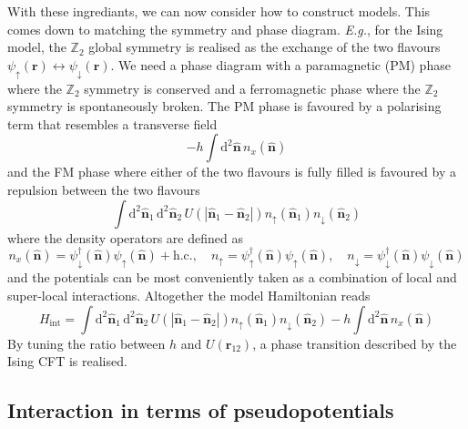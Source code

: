 \documentclass{timesjhep}
\begin{document}
With these ingrediants, we can now consider how to construct models. This comes down to matching the symmetry and phase diagram. \textit{E.g.}, for the Ising model, the $\mathbb{Z}_2$ global symmetry is realised as the exchange of the two flavours $\psi_\uparrow(\mathbf{r})\leftrightarrow\psi_\downarrow(\mathbf{r})$. We need a phase diagram with a paramagnetic (PM) phase where the $\mathbb{Z}_2$ symmetry is conserved and a ferromagnetic phase where the $\mathbb{Z}_2$ symmetry is spontaneously broken. The PM phase is favoured by a polarising term that resembles a transverse field
\begin{equation*}
    -h\int\mathrm{d}^2\hat{\mathbf{n}}\,n_x(\hat{\mathbf{n}})
\end{equation*}
and the FM phase where either of the two flavours is fully filled is favoured by a repulsion between the two flavours 
\begin{equation*}
    \int\mathrm{d}^2\hat{\mathbf{n}}_1\,\mathrm{d}^2\hat{\mathbf{n}}_2\,U(|\hat{\mathbf{n}}_1-\hat{\mathbf{n}}_2|)n_\uparrow(\hat{\mathbf{n}}_1)n_\downarrow(\hat{\mathbf{n}}_2) 
\end{equation*} 
where the density operators are defined as 
\begin{equation*}
    n_x(\hat{\mathbf{n}})=\psi^\dagger_\downarrow(\hat{\mathbf{n}})\psi_\uparrow(\hat{\mathbf{n}})+\mathrm{h.c.},\quad n_\uparrow=\psi^\dagger_\uparrow(\hat{\mathbf{n}})\psi_\uparrow(\hat{\mathbf{n}}),\quad n_\downarrow=\psi^\dagger_\downarrow(\hat{\mathbf{n}})\psi_\downarrow(\hat{\mathbf{n}}) 
\end{equation*}
and the potentials can be most conveniently taken as a combination of local and super-local interactions. Altogether the model Hamiltonian reads 
\begin{equation}
    H_\mathrm{int}=\int\mathrm{d}^2\hat{\mathbf{n}}_1\,\mathrm{d}^2\hat{\mathbf{n}}_2\,U(|\hat{\mathbf{n}}_1-\hat{\mathbf{n}}_2|)n_↑(\hat{\mathbf{n}}_1)n_\downarrow(\hat{\mathbf{n}}_2)-h\int\mathrm{d}^2\hat{\mathbf{n}}\,n_x(\hat{\mathbf{n}})
    \label{eq:ising_hmt}
\end{equation}
By tuning the ratio between $h$ and $U(\mathbf{r}_{12})$, a phase transition described by the Ising CFT is realised. 

\subsection{Interaction in terms of pseudopotentials}
\end{document}
